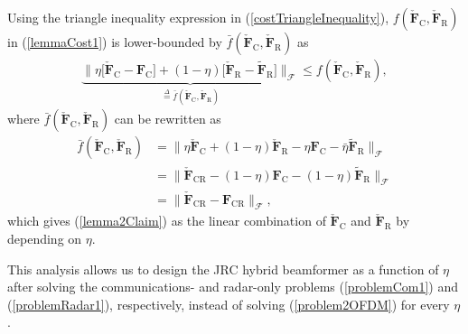 \documentclass[journal,10pt]{IEEEtran}
\begin{document}
{\begin{IEEEproof}
			Using the triangle inequality expression in (\ref{costTriangleInequality}), $f(\check{\mathbf{F}}_\mathrm{C},\check{\mathbf{F}}_\mathrm{R})$  in (\ref{lemmaCost1}) is lower-bounded by $\bar{f}(\check{\mathbf{F}}_\mathrm{C},\check{\mathbf{F}}_\mathrm{R})$ as 
			\begin{align}
			\underbrace{\|\eta\big[\check{\mathbf{F}}_\mathrm{C}  -  \mathbf{F}_\mathrm{C}\big] + (1 - \eta)\big[\check{\mathbf{F}}_\mathrm{R}  -  \widetilde{\mathbf{F}}_\mathrm{R}\big]\|_\mathcal{F}}_{\overset{\Delta}{=}\bar{f}(\check{\mathbf{F}}_\mathrm{C},\check{\mathbf{F}}_\mathrm{R})}  \leq  {f}(\check{\mathbf{F}}_\mathrm{C},\check{\mathbf{F}}_\mathrm{R}),
			\end{align}
			where $\bar{f}(\check{\mathbf{F}}_\mathrm{C},\check{\mathbf{F}}_\mathrm{R})$ can be rewritten as 
			\begin{align}
			\bar{f}(\check{\mathbf{F}}_\mathrm{C},\check{\mathbf{F}}_\mathrm{R})
			& = \|\eta\check{\mathbf{F}}_\mathrm{C}  + (1 - \eta)\check{\mathbf{F}}_\mathrm{R} - \eta\mathbf{F}_\mathrm{C}  - \bar{\eta}\widetilde{\mathbf{F}}_\mathrm{R}\|_\mathcal{F} \nonumber\\
			& = \| \check{\mathbf{F}}_\mathrm{CR} - (1 - \eta)\mathbf{F}_\mathrm{C}  - (1 - \eta)\widetilde{\mathbf{F}}_\mathrm{R} \|_\mathcal{F}\nonumber\\
			& = \| \check{\mathbf{F}}_\mathrm{CR} - \mathbf{F}_\mathrm{CR}  \|_\mathcal{F},
			\end{align}
			which gives (\ref{lemma2Claim}) as the linear combination of $\check{\mathbf{F}}_\mathrm{C}$ and $\check{\mathbf{F}}_\mathrm{R}$ by depending on $\eta$. 
		\end{IEEEproof}
		
		This analysis allows us to design the JRC hybrid beamformer as a function of $\eta$ after solving the communications- and radar-only problems (\ref{problemCom1}) and (\ref{problemRadar1}), respectively, instead of solving (\ref{problem2OFDM}) for every $\eta$.
		
	}
\end{document}
